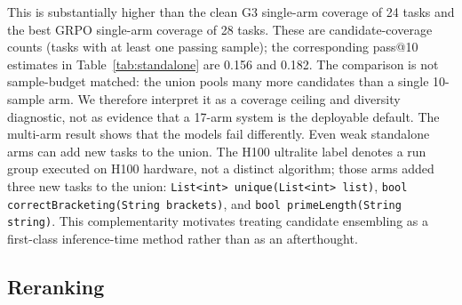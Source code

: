 \documentclass[11pt]{article}
\begin{document}
This is substantially higher than the clean G3 single-arm coverage of 24 tasks and the best GRPO single-arm coverage of 28 tasks. These are candidate-coverage counts (tasks with at least one passing sample); the corresponding pass@10 estimates in Table~\ref{tab:standalone} are 0.156 and 0.182. The comparison is not sample-budget matched: the union pools many more candidates than a single 10-sample arm. We therefore interpret it as a coverage ceiling and diversity diagnostic, not as evidence that a 17-arm system is the deployable default. The multi-arm result shows that the models fail differently. Even weak standalone arms can add new tasks to the union. The H100 ultralite label denotes a run group executed on H100 hardware, not a distinct algorithm; those arms added three new tasks to the union: \texttt{List<int> unique(List<int> list)}, \texttt{bool correctBracketing(String brackets)}, and \texttt{bool primeLength(String string)}. This complementarity motivates treating candidate ensembling as a first-class inference-time method rather than as an afterthought.

\subsection{Reranking}

\begin{table}[t]
\centering
\small
\caption{Deployable compile-cluster reranking on recent H100 arms. Rates are measured on the 154-task pass-set candidate pools, not the 126-task compile/CodeBLEU set. Orig. denotes the first/original candidate, Sel. denotes the compile-cluster-selected candidate, and Oracle pass denotes a hidden-test upper-bound diagnostic.}
\label{tab:rerank}
\end{table}
\end{document}
